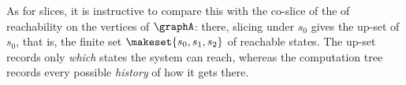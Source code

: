 \begin{example}
    As for slices, it is instructive to compare this with the co-slice of the  of reachability on the vertices of $\graphA$: there, slicing under $s_0$ gives the up-set of $s_0$, that is, the finite set $\makeset{s_0, s_1, s_2}$ of reachable states.
    The up-set records only \emph{which} states the system can reach, whereas the computation tree records every possible \emph{history} of how it gets there.
\end{example}
